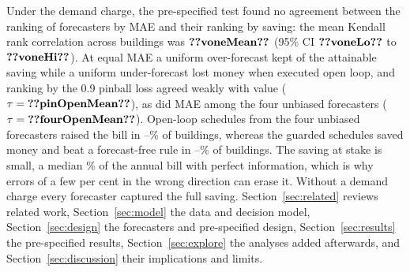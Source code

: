 Under the demand charge, the pre-specified test found no agreement between the ranking of forecasters by MAE and their ranking by saving: the mean Kendall rank correlation across buildings was $\res{voneMean}$ (95\% CI $\res{voneLo}$ to $\res{voneHi}$). At equal MAE a uniform over-forecast kept  of the attainable saving while a uniform under-forecast lost money when executed open loop, and ranking by the 0.9 pinball loss agreed weakly with value ($\tau=\res{pinOpenMean}$), as did MAE among the four unbiased forecasters ($\tau=\res{fourOpenMean}$). Open-loop schedules from the four unbiased forecasters raised the bill in --\% of buildings, whereas the guarded schedules saved money and beat a forecast-free rule in --\% of buildings. The saving at stake is small, a median \% of the annual bill with perfect information, which is why errors of a few per cent in the wrong direction can erase it. Without a demand charge every forecaster captured the full saving. Section~\ref{sec:related} reviews related work, Section~\ref{sec:model} the data and decision model, Section~\ref{sec:design} the forecasters and pre-specified design, Section~\ref{sec:results} the pre-specified results, Section~\ref{sec:explore} the analyses added afterwards, and Section~\ref{sec:discussion} their implications and limits.
